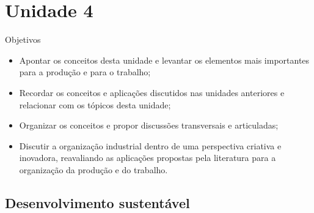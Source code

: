 \documentclass{article}
\begin{document}
\section{Unidade 4}

Objetivos

\begin{itemize}
    \item Apontar os conceitos desta unidade e levantar os elementos mais importantes para a produção e para o trabalho;
    \item Recordar os conceitos e aplicações discutidos nas unidades anteriores e relacionar com os tópicos desta unidade;
    \item Organizar os conceitos e propor discussões transversais e articuladas;
    \item Discutir a organização industrial dentro de uma perspectiva criativa e inovadora, reavaliando as aplicações propostas pela literatura para a organização da produção e do trabalho.
\end{itemize}

\subsection{Desenvolvimento sustentável}
\end{document}
